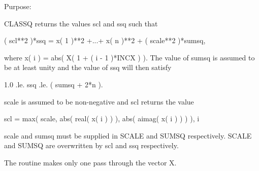  \begin{DoxyParagraph}{Purpose\+: }
\begin{DoxyVerb} CLASSQ returns the values scl and ssq such that

    ( scl**2 )*ssq = x( 1 )**2 +...+ x( n )**2 + ( scale**2 )*sumsq,

 where x( i ) = abs( X( 1 + ( i - 1 )*INCX ) ). The value of sumsq is
 assumed to be at least unity and the value of ssq will then satisfy

    1.0 .le. ssq .le. ( sumsq + 2*n ).

 scale is assumed to be non-negative and scl returns the value

    scl = max( scale, abs( real( x( i ) ) ), abs( aimag( x( i ) ) ) ),
           i

 scale and sumsq must be supplied in SCALE and SUMSQ respectively.
 SCALE and SUMSQ are overwritten by scl and ssq respectively.

 The routine makes only one pass through the vector X.\end{DoxyVerb}
 
\end{DoxyParagraph}

